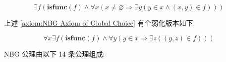 \begin{axiom}
    \label {axiom:NBG Axiom of Global Choice}
    \[
        \exists f (\mathbf{isfunc} (f) \land \forall x (x \neq \varnothing \Rightarrow \exists y (y \in x \land (x,y) \in f)))
    \]
\end{axiom}

上述 \ref{axiom:NBG Axiom of Global Choice} 有个弱化版本如下:

\begin{axiom}
    \label {axiom:NBG Axiom of Choice}
    \[
        \forall x \exists f (\mathbf{isfunc} (f) \land \forall y (y \in x \Rightarrow \exists z ((y,z) \in f)))
    \]
\end{axiom}

NBG 公理由以下 14 条公理组成:

